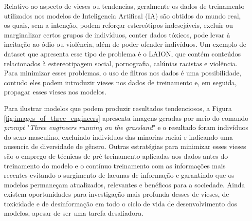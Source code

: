 Relativo ao aspecto de vieses ou tendencias, geralmente os dados de treinamento 
utilizados nos modelos de Inteligencia Artifical (IA) são obtidos do mundo real,
os quais, sem a intenção, podem reforçar estereótipos indesejáveis, excluir ou marginalizar certos grupos de indivíduos, 
conter dados tóxicos, pode levar à incitação ao ódio ou violência, além de poder ofender indivíduos. 
Um exemplo de dataset que apresenta esse tipo de problema é o LAION, que contém conteúdos relacionados à estereotipagem social,
pornografia, calúnias racistas e violência. Para minimizar esses problemas, o uso de filtros nos dados é uma possibilidade,
contudo eles podem introduzir vieses nos dados de treinamento e, em seguida, propagar esses vieses nos modelos.

Para ilustrar modelos que podem produzir resultados tendenciosos, a Figura \ref{fig:images_of_three_engineers} apresenta 
imagens geradas por meio do comando \textit{prompt} "\textit{Three engineers running on the grassland}" 
e o resultado foram indivíduos do sexo masculino, excluindo indivíduos das minorias raciai e
indicando uma ausencia de diversidade de gênero.
Outras estratégias para minimizar esses vieses são o emprego de técnicas de pré-treinamento aplicadas aos dados antes do treinamento do 
modelo e o contínuo treinamento com as informações mais recentes evitando o 
surgimento de lacunas de informação e garantindo que os modelos permaneçam atualizados, relevantes 
e benéficos para a sociedade. Ainda existem oportunidades para investigação mais profunda desses de vieses, de
toxicidade e de desinformação em todo o ciclo de vida de desenvolvimento dos modelos, 
apesar de ser uma tarefa desafiadora.


